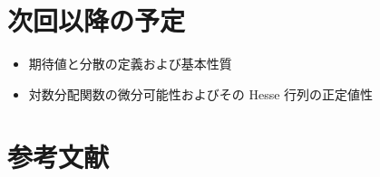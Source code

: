 \documentclass[report]{jlreq}
\begin{document}
\section{次回以降の予定}

\begin{itemize}
    \item 期待値と分散の定義および基本性質
    \item 対数分配関数の微分可能性およびその Hesse 行列の正定値性
\end{itemize}

%
\section{参考文献}

{
    \renewcommand{\bibsection}{}
    
    
}
\end{document}
